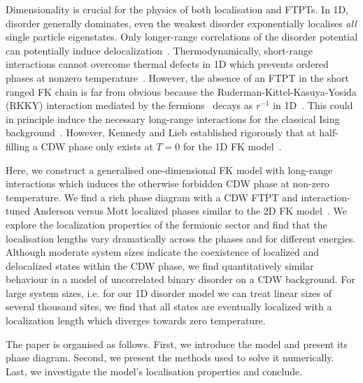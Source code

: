 Dimensionality is crucial for the physics of both localisation and \acp{FTPT}. In 1D, disorder generally dominates, even the weakest disorder exponentially localises \textit{all} single particle eigenstates. Only longer-range correlations of the disorder potential can potentially induce delocalization~\cite{aubryAnalyticityBreakingAnderson1980,dassarmaLocalizationMobilityEdges1990,dunlapAbsenceLocalizationRandomdimer1990}. Thermodynamically, short-range interactions cannot overcome thermal defects in 1D which prevents ordered phases at nonzero temperature~\cite{andersonAbsenceDiffusionCertain1958,goldshteinPurePointSpectrum1977a,abrahamsScalingTheoryLocalization1979,kramerLocalizationTheoryExperiment1993}. However, the absence of an \ac{FTPT} in the short ranged \ac{FK} chain is far from obvious because the Ruderman-Kittel-Kasuya-Yosida (RKKY) interaction mediated by the fermions~\cite{kasuyaTheoryMetallicFerro1956,rudermanIndirectExchangeCoupling1954,vanvleckNoteInteractionsSpins1962,yosidaMagneticPropertiesCuMn1957} decays as \(r^{-1}\) in 1D~\cite{rusinCalculationRKKYRange2017a}. This could in principle induce the necessary long-range interactions for the classical Ising background~\cite{thoulessLongRangeOrderOneDimensional1969,peierlsIsingModelFerromagnetism1936}. However, Kennedy and Lieb established rigorously that at half-filling a \ac{CDW} phase only exists at \(T = 0\) for the 1D \ac{FK} model~\cite{kennedyItinerantElectronModel1986}. 

Here, we construct a generalised one-dimensional \ac{FK} model with long-range interactions which induces the otherwise forbidden \ac{CDW} phase at non-zero temperature. We find a rich phase diagram with a CDW FTPT and interaction-tuned Anderson versus Mott localized phases similar to the 2D \ac{FK} model~\cite{antipovInteractionTunedAndersonMott2016}. We explore the localization properties of the fermionic sector and find that the localisation lengths vary dramatically across the phases and for different energies. Although moderate system sizes indicate the coexistence of localized and delocalized states within the CDW phase, we find quantitatively similar behaviour in a model of uncorrelated binary disorder on a \ac{CDW} background. For large system sizes, i.e. for our 1D disorder model we can treat linear sizes of several thousand sites, we find that all states are eventually localized with a localization length which diverges towards zero temperature.   

The paper is organised as follows. First, we introduce the model and present its phase diagram. Second, we present the methods used to solve it numerically. Last, we investigate the model's localisation properties and conclude.

